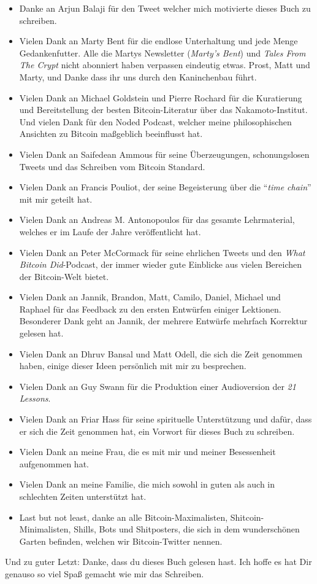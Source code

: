 \begin{itemize}
  \item Danke an Arjun Balaji für den Tweet welcher mich motivierte dieses Buch zu schreiben.
  \item Vielen Dank an Marty Bent für die endlose Unterhaltung und jede Menge Gedankenfutter. Alle die Martys Newsletter (\textit{Marty's Bent}) und \textit{Tales From The Crypt} nicht abonniert haben verpassen eindeutig etwas. Prost, Matt und Marty, und Danke dass ihr uns durch den Kaninchenbau führt.
  \item Vielen Dank an Michael Goldstein und Pierre Rochard für die Kuratierung und Bereitstellung der besten Bitcoin-Literatur über das Nakamoto-Institut. Und vielen Dank für den Noded Podcast, welcher meine philosophischen Ansichten zu Bitcoin maßgeblich beeinflusst hat.
  \item Vielen Dank an Saifedean Ammous für seine Überzeugungen, schonungslosen Tweets und das Schreiben vom Bitcoin Standard.
  \item Vielen Dank an Francis Pouliot, der seine Begeisterung über die \enquote{\textit{time chain}} mit mir geteilt hat.
  \item Vielen Dank an Andreas M. Antonopoulos für das gesamte Lehrmaterial, welches er im Laufe der Jahre veröffentlicht hat.
  \item Vielen Dank an Peter McCormack für seine ehrlichen Tweets und den \textit{What Bitcoin Did}-Podcast, der immer wieder gute Einblicke aus vielen Bereichen der Bitcoin-Welt bietet.
  \item Vielen Dank an Jannik, Brandon, Matt, Camilo, Daniel, Michael und Raphael für das Feedback zu den ersten Entwürfen einiger Lektionen. Besonderer Dank geht an Jannik, der mehrere Entwürfe mehrfach Korrektur gelesen hat.
  \item Vielen Dank an Dhruv Bansal und Matt Odell, die sich die Zeit genommen haben, einige dieser Ideen persönlich mit mir zu besprechen.
  \item Vielen Dank an Guy Swann für die Produktion einer Audioversion der \textit{21 Lessons}.
  \item Vielen Dank an Friar Hass für seine spirituelle Unterstützung und dafür, dass er sich die Zeit genommen hat, ein Vorwort für dieses Buch zu schreiben.
  \item Vielen Dank an meine Frau, die es mit mir und meiner Besessenheit aufgenommen hat.
  \item Vielen Dank an meine Familie, die mich sowohl in guten als auch in schlechten Zeiten unterstützt hat.
  \item Last but not least, danke an alle Bitcoin-Maximalisten, Shitcoin-Minimalisten, Shills, Bots und Shitposters, die sich in dem wunderschönen Garten befinden, welchen wir Bitcoin-Twitter nennen.
\end{itemize}

Und zu guter Letzt: Danke, dass du dieses Buch gelesen hast. Ich hoffe es hat Dir genauso so viel Spaß gemacht wie mir das Schreiben.
